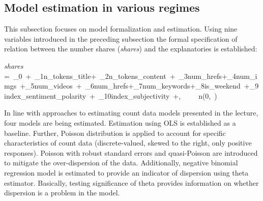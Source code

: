 \documentclass{article}
\begin{document}
\subsection{Model estimation in various regimes}

This subsection focuses on model formalization and estimation. Using nine variables introduced in the preceding subsection the formal specification of relation between the number shares (\textit{shares}) and the explanatories is established:

\bigskip

\textit{shares} =\ \beta_0\ +\ \beta_1n\_tokens\_title+\ \beta_2n\_tokens\_content\ +\ \beta_3num\_hrefs+\beta_4num\_imgs\ +\beta_5num\_videos\ +\ \beta_6num\_hrefs+\beta_7num\_keywords+\beta_8is\_weekend\ +\beta_9index\_sentiment\_polarity\ +\ \beta_{10}index\_subjectivity\ +\varepsilon,\ \ \varepsilon\ ~\ n(0,\ \sigma)

\bigskip

In line with approaches to estimating count data models presented in the lecture, four models are being estimated. Estimation using OLS is established as a baseline. Further, Poisson distribution is applied to account for specific characteristics of count data (discrete-valued, skewed to the right, only positive responses). Poisson with robust standard errors and quasi-Poisson are introduced to mitigate the over-dispersion of the data. Additionally, negative binomial regression model is estimated to provide an indicator of dispersion using theta estimator. Basically, testing significance of theta provides information on whether dispersion is a problem in the model.
\end{document}
